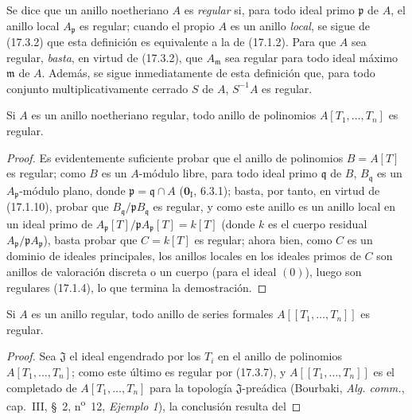 \begin{env}[17.3.6]
\label{0.17.3.6-es}
Se dice que un anillo noetheriano $A$ es \emph{regular} si, para todo ideal
primo $\mathfrak{p}$ de $A$, el anillo local $A_{\mathfrak{p}}$ es regular;
cuando el propio $A$ es un anillo \emph{local}, se sigue de (17.3.2) que esta
definición es equivalente a la de (17.1.2). Para que $A$ sea regular, \emph{basta},
en virtud de (17.3.2), que $A_{\mathfrak{m}}$ sea regular para todo ideal
máximo $\mathfrak{m}$ de $A$. Además, se sigue inmediatamente de esta
definición que, para todo conjunto multiplicativamente cerrado $S$ de $A$,
$S^{-1}A$ es regular.
\end{env}

\begin{proposition}[17.3.7]
\label{0.17.3.7-es}
Si $A$ es un anillo noetheriano regular, todo anillo de polinomios
$A[T_1,\ldots,T_n]$ es regular.
\end{proposition}

\begin{proof}
Es evidentemente suficiente probar que el anillo de polinomios $B=A[T]$ es
regular; como $B$ es un $A$-módulo libre, para todo ideal primo
$\mathfrak{q}$ de $B$, $B_{\mathfrak{q}}$ es un
$A_{\mathfrak{p}}$-módulo plano, donde $\mathfrak{p}=\mathfrak{q}\cap A$
($\mathbf{0}_{\mathrm I}$, 6.3.1); basta, por tanto, en virtud de (17.1.10), probar que
$B_{\mathfrak{q}}/\mathfrak{p}B_{\mathfrak{q}}$ es regular, y como este anillo
es un anillo local en un ideal primo de
$A_{\mathfrak{p}}[T]/\mathfrak{p}A_{\mathfrak{p}}[T]=k[T]$ (donde $k$ es el
cuerpo residual $A_{\mathfrak{p}}/\mathfrak{p}A_{\mathfrak{p}}$), basta
probar que $C=k[T]$ es regular; ahora bien, como $C$ es un dominio de ideales
principales, los anillos locales en los ideales primos de $C$ son anillos de
valoración discreta o un cuerpo (para el ideal $(0)$), luego son regulares
(17.1.4), lo que termina la demostración.
\end{proof}

\begin{corollary}[17.3.8]
\label{0.17.3.8-es}
Si $A$ es un anillo regular, todo anillo de series formales
$A[[T_1,\ldots,T_n]]$ es regular.
\end{corollary}

\begin{proof}
Sea $\mathfrak{J}$ el ideal engendrado por los $T_i$ en el anillo de polinomios
$A[T_1,\ldots,T_n]$; como este último es regular por (17.3.7), y
$A[[T_1,\ldots,T_n]]$ es el completado de $A[T_1,\ldots,T_n]$ para la
topología $\mathfrak{J}$-preádica (Bourbaki, \emph{Alg. comm.}, cap.~III,
\S~2, n\textsuperscript{o}~12, \emph{Ejemplo 1}), la conclusión resulta del
\end{proof}

